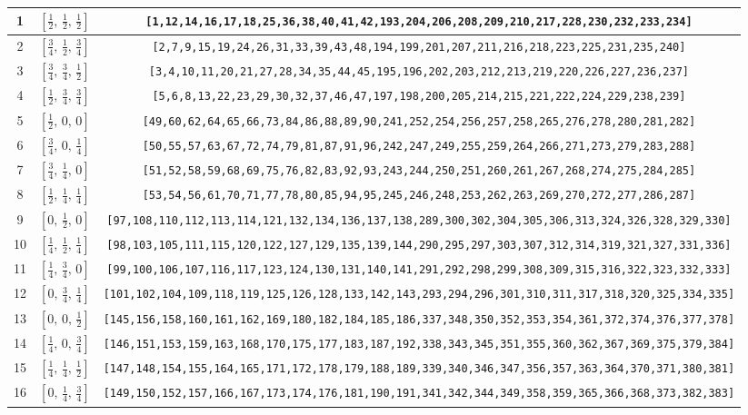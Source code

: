 \documentclass[fleqn,8pt]{jsarticle}
\begin{document}
\begin{longtable}{ccc}
1 & $\left[ \frac{1}{2},\, \frac{1}{2},\, \frac{1}{2} \right]$ & {\tt [1,12,14,16,17,18,25,36,38,40,41,42,193,204,206,208,209,210,217,228,230,232,233,234]} \\ \hline
2 & $\left[ \frac{3}{4},\, \frac{1}{2},\, \frac{3}{4} \right]$ & {\tt [2,7,9,15,19,24,26,31,33,39,43,48,194,199,201,207,211,216,218,223,225,231,235,240]} \\ \hline
3 & $\left[ \frac{3}{4},\, \frac{3}{4},\, \frac{1}{2} \right]$ & {\tt [3,4,10,11,20,21,27,28,34,35,44,45,195,196,202,203,212,213,219,220,226,227,236,237]} \\ \hline
4 & $\left[ \frac{1}{2},\, \frac{3}{4},\, \frac{3}{4} \right]$ & {\tt [5,6,8,13,22,23,29,30,32,37,46,47,197,198,200,205,214,215,221,222,224,229,238,239]} \\ \hline
5 & $\left[ \frac{1}{2},\, 0,\, 0 \right]$ & {\tt [49,60,62,64,65,66,73,84,86,88,89,90,241,252,254,256,257,258,265,276,278,280,281,282]} \\ \hline
6 & $\left[ \frac{3}{4},\, 0,\, \frac{1}{4} \right]$ & {\tt [50,55,57,63,67,72,74,79,81,87,91,96,242,247,249,255,259,264,266,271,273,279,283,288]} \\ \hline
7 & $\left[ \frac{3}{4},\, \frac{1}{4},\, 0 \right]$ & {\tt [51,52,58,59,68,69,75,76,82,83,92,93,243,244,250,251,260,261,267,268,274,275,284,285]} \\ \hline
8 & $\left[ \frac{1}{2},\, \frac{1}{4},\, \frac{1}{4} \right]$ & {\tt [53,54,56,61,70,71,77,78,80,85,94,95,245,246,248,253,262,263,269,270,272,277,286,287]} \\ \hline
9 & $\left[ 0,\, \frac{1}{2},\, 0 \right]$ & {\tt [97,108,110,112,113,114,121,132,134,136,137,138,289,300,302,304,305,306,313,324,326,328,329,330]} \\ \hline
10 & $\left[ \frac{1}{4},\, \frac{1}{2},\, \frac{1}{4} \right]$ & {\tt [98,103,105,111,115,120,122,127,129,135,139,144,290,295,297,303,307,312,314,319,321,327,331,336]} \\ \hline
11 & $\left[ \frac{1}{4},\, \frac{3}{4},\, 0 \right]$ & {\tt [99,100,106,107,116,117,123,124,130,131,140,141,291,292,298,299,308,309,315,316,322,323,332,333]} \\ \hline
12 & $\left[ 0,\, \frac{3}{4},\, \frac{1}{4} \right]$ & {\tt [101,102,104,109,118,119,125,126,128,133,142,143,293,294,296,301,310,311,317,318,320,325,334,335]} \\ \hline
13 & $\left[ 0,\, 0,\, \frac{1}{2} \right]$ & {\tt [145,156,158,160,161,162,169,180,182,184,185,186,337,348,350,352,353,354,361,372,374,376,377,378]} \\ \hline
14 & $\left[ \frac{1}{4},\, 0,\, \frac{3}{4} \right]$ & {\tt [146,151,153,159,163,168,170,175,177,183,187,192,338,343,345,351,355,360,362,367,369,375,379,384]} \\ \hline
15 & $\left[ \frac{1}{4},\, \frac{1}{4},\, \frac{1}{2} \right]$ & {\tt [147,148,154,155,164,165,171,172,178,179,188,189,339,340,346,347,356,357,363,364,370,371,380,381]} \\ \hline
16 & $\left[ 0,\, \frac{1}{4},\, \frac{3}{4} \right]$ & {\tt [149,150,152,157,166,167,173,174,176,181,190,191,341,342,344,349,358,359,365,366,368,373,382,383]} \\
\end{longtable}
\end{document}
